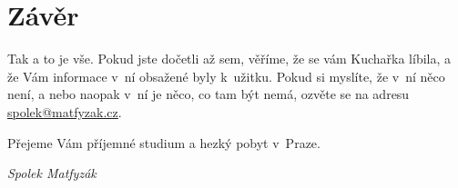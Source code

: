 \section{Závěr}
Tak a to je vše. Pokud jste dočetli až sem, věříme, že se vám
Kuchařka líbila, a že Vám informace v~ní obsažené byly k~užitku.
Pokud si myslíte, že v~ní něco není, a nebo naopak v~ní je něco,
co tam být nemá, ozvěte se na adresu \url{spolek@matfyzak.cz}.

\medskip

Přejeme Vám příjemné studium a hezký pobyt v~Praze.

\hskip 8cm \it Spolek Matfyzák